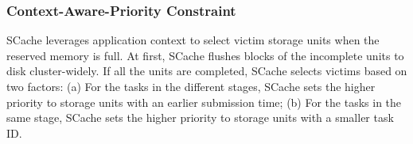 \subsubsection{Context-Aware-Priority Constraint}
{\color{black}
SCache leverages application context to select victim storage units when the reserved memory is full.
At first, SCache flushes blocks of the incomplete units to disk cluster-widely.
If all the units are completed, SCache selects victims based on two factors: 
(a) For the tasks in the different stages, SCache sets the higher priority to storage units with an earlier submission time;
(b) For the tasks in the same stage, SCache sets the higher priority to storage units with a smaller task ID.
}



